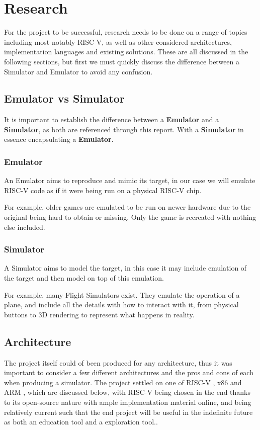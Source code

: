 \chapter{Research}
\label{ch:research}

For the project to be successful, research needs to be done on a range of topics including most notably RISC-V, as-well as other considered architectures, implementation languages and existing solutions. These are all discussed in the following sections, but first we must quickly discuss the difference between a Simulator and Emulator to avoid any confusion.

\section{Emulator vs Simulator}\label{sec:sim_vs_em}
It is important to establish the difference between a \textbf{Emulator} and a \textbf{Simulator}, as both are referenced through this report. With a \textbf{Simulator} in essence encapsulating a \textbf{Emulator}.

\subsection{Emulator}
An Emulator aims to reproduce and mimic its target, in our case we will emulate RISC-V code as if it were being run on a physical RISC-V chip.

For example, older games are emulated to be run on newer hardware due to the original being hard to obtain or missing. Only the game is recreated with nothing else included.
\subsection{Simulator}
A Simulator aims to model the target, in this case it may include emulation of the target and then model on top of this emulation.

For example, many Flight Simulators exist. They emulate the operation of a plane, and include all the details with how to interact with it, from physical buttons to 3D rendering to represent what happens in reality.

\section{Architecture}
The project itself could of been produced for any architecture, thus it was important to consider a few different architectures and the pros and cons of each when producing a simulator. The project settled on one of RISC-V \cite{waterman_2019_the} , x86 \cite{intelcorporation_2023_intel} and ARM \cite{armltd_2023_defining}, which are discussed below, with RISC-V being chosen in the end thanks to its open-source nature with ample implementation material online, and being relatively current such that the end project will be useful in the indefinite future as both an education tool and a exploration tool..

